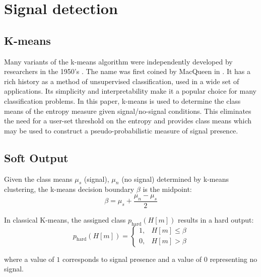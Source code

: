 \section{Signal detection}
\subsection{K-means}
Many variants of the k-means algorithm were independently developed by researchers in the 1950's \citep{kmeansoverview}. The name was first coined by MacQueen in \citep{kmeans}. It has a rich history as a method of unsupervised classification, used in a wide set of applications. Its simplicity and interpretability make it a popular choice for many classification problems.  In this paper, k-means is used to determine the class means of the entropy measure given signal/no-signal conditions. This eliminates the need for a user-set threshold on the entropy and provides class means which may be used to construct a pseudo-probabilistic measure of signal presence. 




\subsection{Soft Output}\label{sec:softoutput}

Given the class means $\mu_s$ (signal), $\mu_n$ (no signal) determined by k-means clustering, the k-means decision boundary $\beta$ is the midpoint:
\begin{equation*}
	\beta = \mu_s + \frac{\mu_n - \mu_s}{2}
\end{equation*}

In classical K-means, the assigned class $p_\text{hard}(H[m])$ results in a hard output:
\begin{equation*}
	p_\text{hard}(H[m]) = \begin{cases}
		1, & H[m] \leq \beta \\
		0, & H[m] > \beta
	\end{cases}
\end{equation*}

\noindent where a value of $1$ corresponds to signal presence and a value of $0$ representing no signal.

